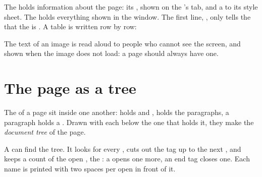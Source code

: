 The  holds information about the page: its , shown on
the 's tab, and a  to its style sheet. The  holds
everything shown in the window. The first line, , only
tells the  that the  is . A table is written row by row:

\label{lst:g9:html-and-css:table}

The  text of an image is read aloud to people who cannot see the
screen, and shown when the image does not load: a page should always have one.

\section{The page as a tree}

\begin{definition}\label{def:g9:html-and-css:tree}
The  of a page sit inside one another:  holds 
and ,  holds the paragraphs, a paragraph holds a .
Drawn with each  below the one that holds it, they make the
\emph{document tree} of the page.
\end{definition}

A  can find the tree. It looks for every \code{<}, cuts out the tag up
to the next \code{>}, and keeps a count of the open , the
: a  opens one more, an end tag closes one. Each 
name is printed with two spaces per open  in front of it.

\label{lst:g9:html-and-css:html-tree}

\label{lst:g9:html-and-css:show-tree}


